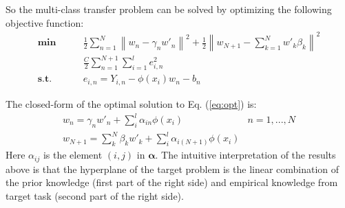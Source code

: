 So the multi-class transfer problem can be solved by optimizing the following objective function:
\begin{equation}\label{eq:opt}
\begin{aligned}
\textbf{min}\qquad {} & \frac{1}{2}\sum\limits_{n = 1}^N {{{\left\| {{w_n} - {\gamma _n}{{w'}_n}} \right\|}^2}}  + \frac{1}{2}{\left\| {{w_{N + 1}} - \sum\limits_{k = 1}^N {w{'_k}{\beta _k}} } \right\|^2}\\& \frac{C}{2}\sum\limits_{n = 1}^{N + 1} {\sum\limits_{i = 1}^l {e_{i,n}^2} }  \\
\textbf{s.t.}\qquad {} &{e_{i,n}} = {Y_{i,n}} - \phi ({x_i}){w_n} - {b_n}
\end{aligned}
\end{equation}

The closed-form of the optimal solution to  Eq. (\ref{eq:opt}) is:
\begin{equation*}
\begin{array}{*{20}{c}}
{{w_n} = {\gamma _n}{{w'}_n} + \sum\limits_i^l {{\alpha _{in}}{\phi(x_i)}} }&{n = 1,...,N}\\
{{w_{N + 1}} = \sum\limits_k^N {{\beta _k}{{w'}_k}}  + \sum\limits_i^l {{\alpha _{i(N + 1)}}{\phi(x_i)}} }&{}
\end{array}
\end{equation*}
Here $\alpha_{ij}$ is the element $(i,j)$ in $\boldsymbol{\alpha}$. The intuitive interpretation of the results above is that the hyperplane of the target problem is the linear combination of the prior knowledge (first part of the right side) and empirical knowledge from target task (second part of the right side).

